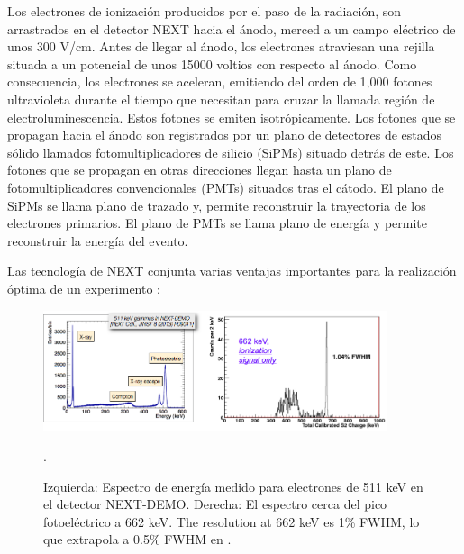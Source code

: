 Los electrones de ionización producidos por el paso de la radiación, son arrastrados en el detector NEXT hacia el ánodo, merced a un campo eléctrico de unos 300 V/cm. Antes de llegar al ánodo, los electrones atraviesan una rejilla situada a un potencial de unos 15000 voltios con respecto al ánodo. Como consecuencia, los electrones se aceleran, emitiendo del orden de 1,000 fotones ultravioleta durante el tiempo que necesitan para cruzar la llamada región de electroluminescencia. Estos fotones se emiten isotrópicamente. Los fotones que se propagan hacia el ánodo son registrados por un plano de detectores de estados sólido llamados fotomultiplicadores de silicio (SiPMs) situado detrás de este. Los fotones que se propagan en otras direcciones llegan hasta un plano de fotomultiplicadores convencionales (PMTs) situados tras el cátodo. El plano de SiPMs se llama plano de trazado y, permite reconstruir la trayectoria de los electrones primarios. El plano de PMTs se llama plano de energía y permite reconstruir la energía del evento. 

Las tecnología de NEXT conjunta varias ventajas importantes para la realización óptima de un experimento \bbonu:
                                    
\begin{figure}
\centering
\includegraphics[width=0.9\textwidth]{img/EResolution.png}
\caption{\small Izquierda: Espectro de energía medido para electrones de 511 keV en el detector NEXT-DEMO. Derecha: El espectro cerca del pico fotoeléctrico a 662 keV. The resolution at 662 keV es 1\% FWHM, lo que extrapola a 0.5\% FWHM en \Qbb.}
\label{fig.ERES}. 
\end{figure}

